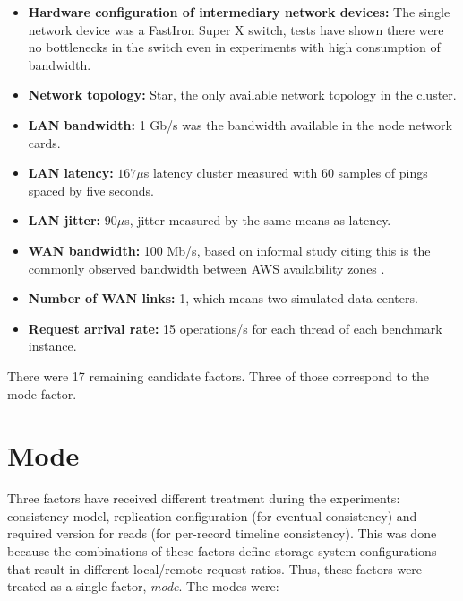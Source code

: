 \documentclass[doublespacing]{bmcart}
\begin{document}
\begin{itemize}
\item \textbf{Hardware configuration of intermediary network devices:} The
single network device was a FastIron Super X switch, tests have shown there were
no bottlenecks in the switch even in experiments with high consumption of bandwidth.

\item \textbf{Network topology:} Star, the only available network topology in
the cluster.

\item \textbf{LAN bandwidth:} 1 Gb/s was the bandwidth available in the node
network cards.

\item \textbf{LAN latency:} $167\mu$s latency cluster measured with 60 samples
of pings spaced by five seconds.

\item \textbf{LAN jitter:} $90\mu$s, jitter measured by the same means as
latency.

\item \textbf{WAN bandwidth:} 100 Mb/s, based on informal study citing this is
the commonly observed  bandwidth between AWS availability zones
\cite{Pujol2012}.

\item \textbf{Number of WAN links:} 1, which means two simulated data centers.

\item \textbf{Request arrival rate:} 15 operations/s for each thread of each
benchmark instance.

\end{itemize}

There were 17 remaining candidate factors. Three of those correspond to the mode
factor.

\section{Mode}

Three factors have received different treatment during the experiments: consistency
model, replication configuration (for eventual consistency) and required version for reads (for per-record timeline consistency). This was done because the combinations of
these factors define storage system configurations that result in different
local/remote request ratios. Thus, these factors were treated as a single factor,
\textit{mode}. The modes were:
\end{document}
